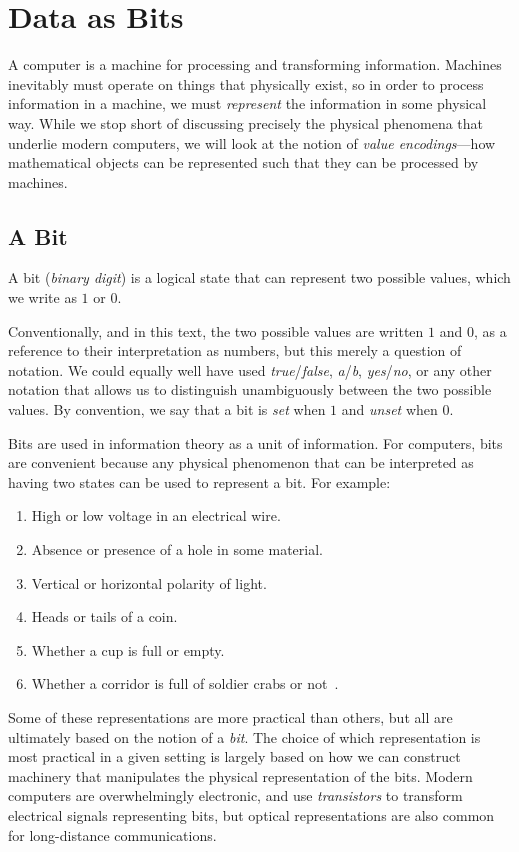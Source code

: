 \chapter{Data as Bits}
\label{chap:bits}

A computer is a machine for processing and transforming information.
Machines inevitably must operate on things that physically exist, so
in order to process information in a machine, we must \emph{represent}
the information in some physical way.  While we stop short of
discussing precisely the physical phenomena that underlie modern
computers, we will look at the notion of \emph{value encodings}---how
mathematical objects can be represented such that they can be
processed by machines.

\section{A Bit}
\label{sec:bit}

\begin{definition}[Bit]
  A bit (\emph{binary digit}) is a logical state that can represent two possible values,
  which we write as $1$ or $0$.
\end{definition}

Conventionally, and in this text, the two possible values are written
$1$ and $0$, as a reference to their interpretation as numbers, but
this merely a question of notation.  We could equally well have used
\emph{true}/\emph{false}, \emph{a}/\emph{b}, \emph{yes}/\emph{no}, or
any other notation that allows us to distinguish unambiguously between the
two possible values.  By convention, we say that a bit is \emph{set}
when $1$ and \emph{unset} when $0$.

Bits are used in information theory as a unit of information.  For
computers, bits are convenient because any physical phenomenon that
can be interpreted as having two states can be used to represent a
bit.  For example:
\begin{enumerate}
\item High or low voltage in an electrical wire.
\item Absence or presence of a hole in some material.
\item Vertical or horizontal polarity of light.
\item Heads or tails of a coin.
\item Whether a cup is full or empty.
\item Whether a corridor is full of soldier crabs or
  not~\cite{gunji2011robust}.
\end{enumerate}
Some of these representations are more practical than others, but all
are ultimately based on the notion of a \emph{bit}. The choice of
which representation is most practical in a given setting is largely
based on how we can construct machinery that manipulates the physical
representation of the bits. Modern computers are overwhelmingly
electronic, and use \emph{transistors} to transform electrical signals
representing bits, but optical representations are also common for
long-distance communications.

